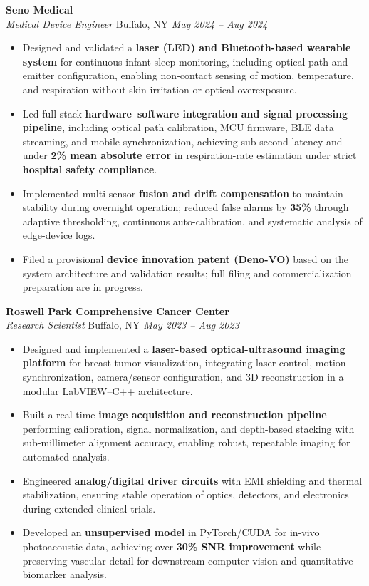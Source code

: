 \item \textbf{Seno Medical}\\
\textit{Medical Device Engineer} \hfill Buffalo, NY \quad \textit{May 2024 -- Aug 2024}
\vspace*{-3pt}
\begin{itemize}[leftmargin=0.2in, topsep=1pt]
  \item Designed and validated a \textbf{laser (LED) and Bluetooth-based wearable system} for continuous infant sleep monitoring, including optical path and emitter configuration, enabling non-contact sensing of motion, temperature, and respiration without skin irritation or optical overexposure.  
  \item Led full-stack \textbf{hardware–software integration and signal processing pipeline}, including optical path calibration, MCU firmware, BLE data streaming, and mobile synchronization, achieving sub-second latency and under \textbf{2\% mean absolute error} in respiration-rate estimation under strict \textbf{hospital safety compliance}.
  \item Implemented multi-sensor \textbf{fusion and drift compensation} to maintain stability during overnight operation; reduced false alarms by \textbf{35\%} through adaptive thresholding, continuous auto-calibration, and systematic analysis of edge-device logs.  
  \item Filed a provisional \textbf{device innovation patent (Deno-VO)} based on the system architecture and validation results; full filing and commercialization preparation are in progress.
\end{itemize}


\vspace*{-1pt}
\item \textbf{Roswell Park Comprehensive Cancer Center}\\
\textit{Research Scientist} \hfill Buffalo, NY \quad \textit{May 2023 -- Aug 2023}
\vspace*{-3pt}
\begin{itemize}[leftmargin=0.2in, topsep=1pt]
  \item Designed and implemented a \textbf{laser-based optical-ultrasound imaging platform} for breast tumor visualization, integrating laser control, motion synchronization, camera/sensor configuration, and 3D reconstruction in a modular LabVIEW–C++ architecture.  
  \item Built a real-time \textbf{image acquisition and reconstruction pipeline} performing calibration, signal normalization, and depth-based stacking with sub-millimeter alignment accuracy, enabling robust, repeatable imaging for automated analysis.  
  \item Engineered \textbf{analog/digital driver circuits} with EMI shielding and thermal stabilization, ensuring stable operation of optics, detectors, and electronics during extended clinical trials.  
  \item Developed an \textbf{unsupervised model} in PyTorch/CUDA for in-vivo photoacoustic data, achieving over \textbf{30\% SNR improvement} while preserving vascular detail for downstream computer-vision and quantitative biomarker analysis.  
\end{itemize} 